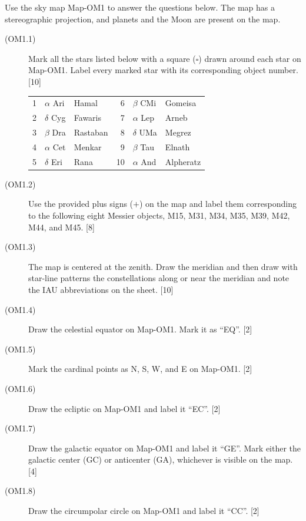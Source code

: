 Use the sky map Map-OM1 to answer the questions below. The map has a stereographic projection, and planets and the Moon are present on the map.
\begin{description}
\item[(OM1.1)] Mark all the stars listed below with a square ($\square$) drawn around each star on Map-OM1. Label every marked star with its corresponding object number. \hfill[10]
\begin{center}
\begin{tabular}{rllrll}
1 & $\alpha$ Ari & Hamal & 6 & $\beta$ CMi & Gomeisa\\
2 & $\delta$ Cyg & Fawaris & 7 & $\alpha$ Lep & Arneb\\
3 & $\beta$ Dra & Rastaban & 8 & $\delta$ UMa & Megrez\\
4 & $\alpha$ Cet & Menkar & 9 & $\beta$ Tau & Elnath\\
5 & $\delta$ Eri & Rana & 10 & $\alpha$ And & Alpheratz\\
\end{tabular}
\end{center}
\item[(OM1.2)] Use the provided plus signs ($+$) on the map and label them corresponding to the following eight Messier objects, M15, M31, M34, M35, M39, M42, M44, and M45. \hfill[8]
\item[(OM1.3)] The map is centered at the zenith. Draw the meridian and then draw with star-line patterns the constellations along or near the meridian and note the IAU abbreviations on the sheet. \hfill[10]
\item[(OM1.4)] Draw the celestial equator on Map-OM1. Mark it as ``EQ''. \hfill[2]
\item[(OM1.5)] Mark the cardinal points as N, S, W, and E on Map-OM1. \hfill[2]
\item[(OM1.6)] Draw the ecliptic on Map-OM1 and label it ``EC''. \hfill[2]
\item[(OM1.7)] Draw the galactic equator on Map-OM1 and label it ``GE''. Mark either the galactic center (GC) or anticenter (GA), whichever is visible on the map. \hfill[4]
\item[(OM1.8)] Draw the circumpolar circle on Map-OM1 and label it ``CC''. \hfill[2]
\end{description}
